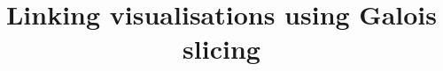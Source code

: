 \documentclass[preprint,acmsmall]{acmart}
\begin{document}
\title{Linking visualisations using Galois slicing}


\maketitle



% 
\end{document}
